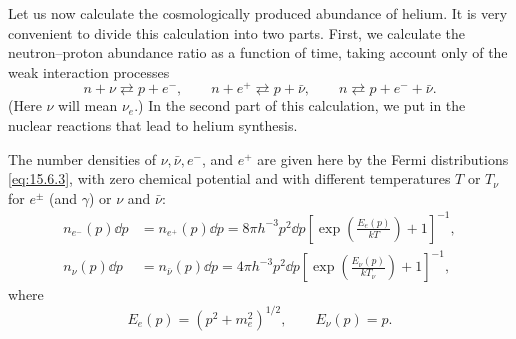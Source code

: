 Let us now calculate the cosmologically produced abundance of helium. It is
very convenient to divide this calculation into two parts. First, we calculate
the neutron--proton abundance ratio as a function of time, taking account only
of the weak interaction processes
\begin{equation}
  n+\nu\rightleftarrows p+e^-,
  \qquad
  n+e^+\rightleftarrows p+\bar\nu,
  \qquad
  n\rightleftarrows p+e^-+\bar\nu.
  \tag{15.7.1}\label{eq:15.7.1}
\end{equation}
(Here \(\nu\) will mean \(\nu_e\).) In the second part of this calculation,
we put in the nuclear reactions that lead to helium synthesis.

The number densities of \(\nu,\bar\nu,e^-\), and \(e^+\) are given here by
the Fermi distributions \eqref{eq:15.6.3}, with zero chemical potential and
with different temperatures \(T\) or \(T_\nu\) for \(e^\pm\) (and \(\gamma\))
or \(\nu\) and \(\bar\nu\):
\[
  \begin{aligned}
    n_{e^-}(p)\dd p
    &=
    n_{e^+}(p)\dd p
    =
    8\pi h^{-3}p^2\dd p
    \left[
      \exp\left(\frac{E_e(p)}{kT}\right)+1
    \right]^{-1},
    \\
    n_\nu(p)\dd p
    &=
    n_{\bar\nu}(p)\dd p
    =
    4\pi h^{-3}p^2\dd p
    \left[
      \exp\left(\frac{E_\nu(p)}{kT_\nu}\right)+1
    \right]^{-1},
  \end{aligned}
\]
where
\[
  E_e(p)=(p^2+m_e^2)^{1/2},
  \qquad
  E_\nu(p)=p.
\]

